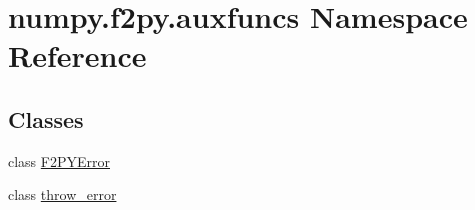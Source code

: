\hypertarget{namespacenumpy_1_1f2py_1_1auxfuncs}{}\section{numpy.\+f2py.\+auxfuncs Namespace Reference}
\label{namespacenumpy_1_1f2py_1_1auxfuncs}
\subsection*{Classes}
\begin{DoxyCompactItemize}
\item 
class \hyperlink{classnumpy_1_1f2py_1_1auxfuncs_1_1F2PYError}{F2\+P\+Y\+Error}
\item 
class \hyperlink{classnumpy_1_1f2py_1_1auxfuncs_1_1throw__error}{throw\+\_\+error}
\end{DoxyCompactItemize}
